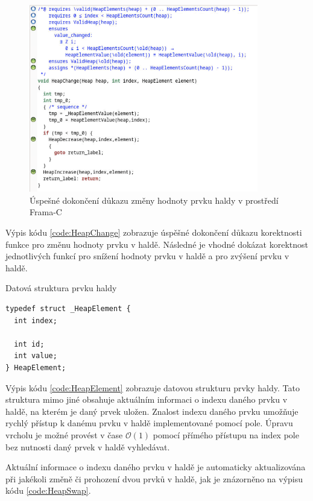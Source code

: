 \begin{figure}[H]
	\centering
	\includegraphics[width=10cm]{images/frama-c-HeapChange}
	\caption{Úspešné dokončení důkazu změny hodnoty prvku haldy v prostředí Frama-C}
	\label{img:F-C-HeapChange}
\end{figure}

Výpis kódu \ref{code:HeapChange} zobrazuje úspěšné dokončení důkazu korektnosti funkce pro změnu hodnoty prvku v haldě. Následné je vhodné dokázat korektnost jednotlivých funkcí pro snížení hodnoty prvku v haldě a pro zvýšení prvku v haldě.

\begin{listing}[H]
	\caption{Datová struktura prvku haldy}
	\label{code:HeapElement}
	\begin{verbatim}
typedef struct _HeapElement {
  int index;

  int id;
  int value;
} HeapElement;
	\end{verbatim}
\end{listing}

Výpis kódu \ref{code:HeapElement} zobrazuje datovou strukturu prvky haldy. Tato struktura mimo jiné obsahuje aktuálním informaci o indexu daného prvku v haldě, na kterém je daný prvek uložen. Znalost indexu daného prvku umožňuje rychlý přístup k danému prvku v haldě implementované pomocí pole. Úpravu vrcholu je možné provést v čase $\mathcal{O}(1)$ pomocí přímého přístupu na index pole bez nutnosti daný prvek v haldě vyhledávat. 

Aktuální informace o indexu daného prvku v haldě je automaticky aktualizována při jakékoli změně či prohození dvou prvků v haldě, jak je znázorněno na výpisu kódu \ref{code:HeapSwap}.


